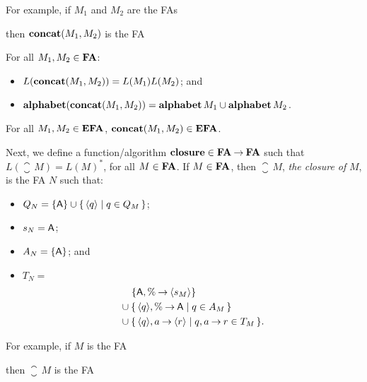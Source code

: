 For example, if $M_1$ and $M_2$ are the FAs
\begin{center}


\end{center}
then $\mathbf{concat}(M_1,M_2)$ is the FA
\begin{center}

\end{center}

\begin{proposition}
For all $M_1,M_2\in\mathbf{FA}$:
\begin{itemize}
\item $L(\mathbf{concat}(M_1,M_2))=L(M_1)L(M_2)$; and

\item $\mathbf{alphabet}(\mathbf{concat}(M_1,M_2))=\mathbf{alphabet}\,M_1\cup\mathbf{alphabet}\,M_2$.
\end{itemize}
\end{proposition}

\begin{proposition}
For all $M_1,M_2\in\mathbf{EFA}$, $\mathbf{concat}(M_1,M_2)\in\mathbf{EFA}$.
\end{proposition}

Next, we define a function/algorithm $\mathbf{closure}\in\mathbf{FA}\mathbin{\to}\mathbf{FA}$ such that
$L(\closure\,M)=L(M)^*$, for all $M\in\mathbf{FA}$.  If $M\in\mathbf{FA}$, then
$\closure\,M$, \emph{the closure of} $M$, is the FA $N$ such that:
\begin{itemize}
\item $Q_N=\{\mathsf{A}\}\cup\{ \, \langle q\rangle \mid q\in Q_M \, \}$;

\item $s_N=\mathsf{A}$;

\item $A_N=\{\mathsf{A}\}$; and

\item $T_N={}$
  \begin{align*}
    &\quad\, \{\mathsf{A},\%\mathbin{\to}\langle s_M\rangle\} \\
    &\cup \{ \, \langle q\rangle,\%\mathbin{\to}\mathsf{A} \mid q\in A_M \, \} \\
    &\cup \{ \, \langle q\rangle,a\mathbin{\to}\langle r\rangle \mid q,a\mathbin{\to} r\in
      T_M \, \}.
  \end{align*}
\end{itemize}

For example, if $M$ is the FA
\begin{center}

\end{center}
then $\closure\,M$ is the FA
\begin{center}

\end{center}


